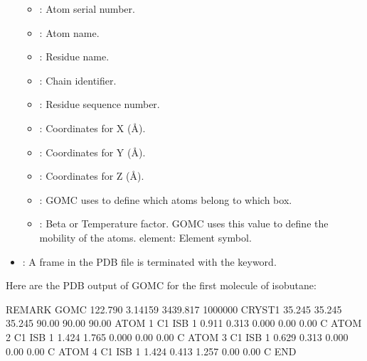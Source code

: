 \documentclass[letterpaper,10pt,english]{sphinxmanual}
\begin{document}
\begin{itemize}
\begin{itemize}
\item {} 
: Atom serial number.

\item {} 
: Atom name.

\item {} 
: Residue name.

\item {} 
: Chain identifier.

\item {} 
: Residue sequence number.

\item {} 
: Coordinates for X (Å).

\item {} 
: Coordinates for Y (Å).

\item {} 
: Coordinates for Z (Å).

\item {} 
: GOMC uses to define which atoms belong to which box.

\item {} 
: Beta or Temperature factor. GOMC uses this value to define the mobility of the atoms. element: Element symbol.

\end{itemize}

\item {} 
:
A frame in the PDB file is terminated with the keyword.

\end{itemize}

Here are the PDB output of GOMC for the first molecule of isobutane:

%
\begin{sphinxVerbatim}[commandchars=\\\{\}]
REMARK       GOMC    122.790    3.14159    3439.817     1000000
CRYST1     35.245     35.245     35.245       90.00       90.00     90.00
ATOM            1         C1        ISB           1       0.911    \PYGZhy{}0.313    0.000     0.00     0.00        C
ATOM            2         C1        ISB           1       1.424    \PYGZhy{}1.765    0.000     0.00     0.00        C
ATOM            3         C1        ISB           1      \PYGZhy{}0.629    \PYGZhy{}0.313    0.000     0.00     0.00        C
ATOM            4         C1        ISB           1       1.424     0.413   \PYGZhy{}1.257     0.00     0.00        C
END
\end{sphinxVerbatim}
\end{document}
